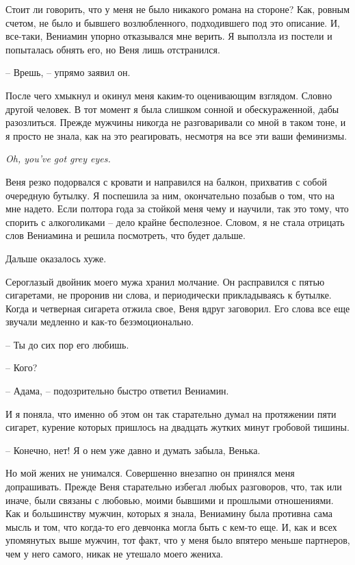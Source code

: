 \documentclass[
]{book}
\begin{document}
Стоит ли говорить, что у меня не было никакого романа на стороне? Как, ровным счетом, не было и бывшего возлюбленного, подходившего под это описание. И, все-таки, Вениамин упорно отказывался мне верить. Я выползла из постели и попыталась обнять его, но Веня лишь отстранился.

-- Врешь, -- упрямо заявил он.

После чего хмыкнул и окинул меня каким-то оценивающим взглядом. Словно другой человек. В тот момент я была слишком сонной и обескураженной, дабы разозлиться. Прежде мужчины никогда не разговаривали со мной в таком тоне, и я просто не знала, как на это реагировать, несмотря на все эти ваши феминизмы.

\emph{Oh, you've got grey eyes.}

Веня резко подорвался с кровати и направился на балкон, прихватив с собой очередную бутылку. Я поспешила за ним, окончательно позабыв о том, что на мне надето. Если полтора года за стойкой меня чему и научили, так это тому, что спорить с алкоголиками -- дело крайне бесполезное. Словом, я не стала отрицать слов Вениамина и решила посмотреть, что будет дальше.

Дальше оказалось хуже.

Сероглазый двойник моего мужа хранил молчание. Он расправился с пятью сигаретами, не проронив ни слова, и периодически прикладываясь к бутылке. Когда и четверная сигарета отжила свое, Веня вдруг заговорил. Его слова все еще звучали медленно и как-то безэмоционально.

-- Ты до сих пор его любишь.

-- Кого?

-- Адама, -- подозрительно быстро ответил Вениамин.

И я поняла, что именно об этом он так старательно думал на протяжении пяти сигарет, курение которых пришлось на двадцать жутких минут гробовой тишины.

-- Конечно, нет! Я о нем уже давно и думать забыла, Венька.

Но мой жених не унимался. Совершенно внезапно он принялся меня допрашивать. Прежде Веня старательно избегал любых разговоров, что, так или иначе, были связаны с любовью, моими бывшими и прошлыми отношениями. Как и большинству мужчин, которых я знала, Вениамину была противна сама мысль и том, что когда-то его девчонка могла быть с кем-то еще. И, как и всех упомянутых выше мужчин, тот факт, что у меня было впятеро меньше партнеров, чем у него самого, никак не утешало моего жениха.
\end{document}
